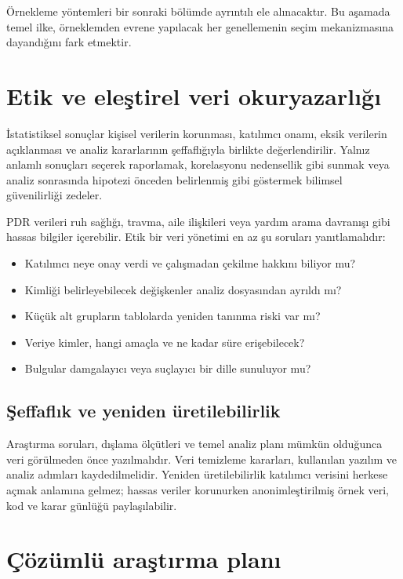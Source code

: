 Örnekleme yöntemleri bir sonraki bölümde ayrıntılı ele alınacaktır. Bu aşamada
temel ilke, örneklemden evrene yapılacak her genellemenin seçim mekanizmasına
dayandığını fark etmektir.

\section{Etik ve eleştirel veri okuryazarlığı}

İstatistiksel sonuçlar kişisel verilerin korunması, katılımcı onamı, eksik
verilerin açıklanması ve analiz kararlarının şeffaflığıyla birlikte
değerlendirilir. Yalnız anlamlı sonuçları seçerek raporlamak, korelasyonu
nedensellik gibi sunmak veya analiz sonrasında hipotezi önceden belirlenmiş
gibi göstermek bilimsel güvenilirliği zedeler.

PDR verileri ruh sağlığı, travma, aile ilişkileri veya yardım arama davranışı
gibi hassas bilgiler içerebilir. Etik bir veri yönetimi en az şu soruları
yanıtlamalıdır:

\begin{itemize}
  \item Katılımcı neye onay verdi ve çalışmadan çekilme hakkını biliyor mu?
  \item Kimliği belirleyebilecek değişkenler analiz dosyasından ayrıldı mı?
  \item Küçük alt grupların tablolarda yeniden tanınma riski var mı?
  \item Veriye kimler, hangi amaçla ve ne kadar süre erişebilecek?
  \item Bulgular damgalayıcı veya suçlayıcı bir dille sunuluyor mu?
\end{itemize}

\subsection{Şeffaflık ve yeniden üretilebilirlik}

Araştırma soruları, dışlama ölçütleri ve temel analiz planı mümkün olduğunca
veri görülmeden önce yazılmalıdır. Veri temizleme kararları, kullanılan yazılım
ve analiz adımları kaydedilmelidir. Yeniden üretilebilirlik katılımcı verisini
herkese açmak anlamına gelmez; hassas veriler korunurken anonimleştirilmiş
örnek veri, kod ve karar günlüğü paylaşılabilir.

\section{Çözümlü araştırma planı}

